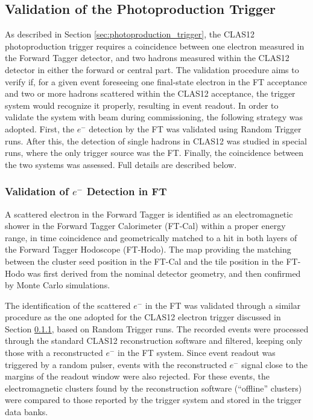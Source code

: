 \subsection{Validation of the Photoproduction Trigger}

As described in Section \ref{sec:photoproduction_trigger}, the CLAS12 photoproduction trigger requires a coincidence between one electron measured in the Forward Tagger detector, and two hadrons measured within the CLAS12 detector in either the forward or central part. The validation procedure aims to verify if, for a given event foreseeing one final-state electron in the FT acceptance and two or more hadrons scattered within the CLAS12 acceptance, the trigger system would recognize it properly, resulting in event readout. In order to validate the system with beam during commissioning, the following strategy was adopted. First, the $e^-$ detection by the FT was validated using Random Trigger runs. After this, the detection of single hadrons in CLAS12 was studied in special runs, where the only trigger source was the FT. Finally, the coincidence between the two systems was assessed. Full details are described below.

\subsubsection{Validation of $e^-$ Detection in FT}

A scattered electron in the Forward Tagger is identified as an electromagnetic shower in the Forward Tagger Calorimeter (FT-Cal) within a proper energy range, in time coincidence and geometrically matched to a hit in both layers of the Forward Tagger Hodoscope (FT-Hodo). The map providing the matching between the cluster seed position in the FT-Cal and the tile position in the FT-Hodo was first derived from the nominal detector geometry, and then confirmed by Monte Carlo simulations.

The identification of the scattered $e^-$ in the FT was validated through a similar procedure as the one adopted for the CLAS12 electron trigger discussed in Section \ref{}, based on Random Trigger runs. The recorded events were processed through the standard CLAS12 reconstruction software and filtered, keeping only those with a reconstructed $e^-$ in the FT system. Since event readout was triggered by a random pulser, events with the reconstructed $e^-$ signal close to the margins of the readout window were also rejected. For these events, the electromagnetic clusters found by the reconstruction software (``offline'' clusters) were compared to those reported by the trigger system and stored in the trigger data banks.

